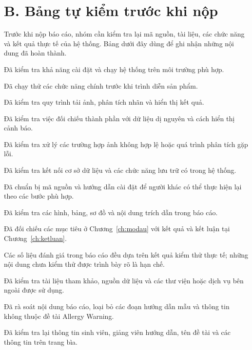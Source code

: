 \section*{B. Bảng tự kiểm trước khi nộp}
{}

Trước khi nộp báo cáo, nhóm cần kiểm tra lại mã nguồn, tài liệu,
các chức năng và kết quả thực tế của hệ thống. Bảng dưới đây dùng
để ghi nhận những nội dung đã hoàn thành.

\begin{tukiem}
    \item Đã kiểm tra khả năng cài đặt và chạy hệ thống trên môi
    trường phù hợp.

    \item Đã chạy thử các chức năng chính trước khi trình diễn
    sản phẩm.

    \item Đã kiểm tra quy trình tải ảnh, phân tích nhãn và hiển
    thị kết quả.

    \item Đã kiểm tra việc đối chiếu thành phần với dữ liệu dị
    nguyên và cách hiển thị cảnh báo.

    \item Đã kiểm tra xử lý các trường hợp ảnh không hợp lệ hoặc
    quá trình phân tích gặp lỗi.

    \item Đã kiểm tra kết nối cơ sở dữ liệu và các chức năng lưu
    trữ có trong hệ thống.

    \item Đã chuẩn bị mã nguồn và hướng dẫn cài đặt để người khác
    có thể thực hiện lại theo các bước phù hợp.

    \item Đã kiểm tra các hình, bảng, sơ đồ và nội dung trích dẫn
    trong báo cáo.

    \item Đã đối chiếu các mục tiêu ở Chương~\ref{ch:modau} với
    kết quả và kết luận tại Chương~\ref{ch:ketluan}.

    \item Các số liệu đánh giá trong báo cáo đều dựa trên kết quả
    kiểm thử thực tế; những nội dung chưa kiểm thử được trình bày
    rõ là hạn chế.

    \item Đã kiểm tra tài liệu tham khảo, nguồn dữ liệu và các
    thư viện hoặc dịch vụ bên ngoài được sử dụng.

    \item Đã rà soát nội dung báo cáo, loại bỏ các đoạn hướng dẫn
    mẫu và thông tin không thuộc đề tài Allergy Warning.

    \item Đã kiểm tra lại thông tin sinh viên, giảng viên hướng
    dẫn, tên đề tài và các thông tin trên trang bìa.
\end{tukiem}

